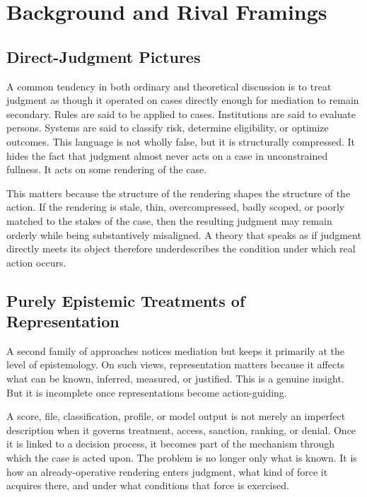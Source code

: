 \documentclass[11pt]{article}
\begin{document}
\section{Background and Rival Framings}

\subsection{Direct-Judgment Pictures}

A common tendency in both ordinary and theoretical discussion is to treat judgment as though it operated on cases directly enough for mediation to remain secondary. Rules are said to be applied to cases. Institutions are said to evaluate persons. Systems are said to classify risk, determine eligibility, or optimize outcomes. This language is not wholly false, but it is structurally compressed. It hides the fact that judgment almost never acts on a case in unconstrained fullness. It acts on some rendering of the case.

This matters because the structure of the rendering shapes the structure of the action. If the rendering is stale, thin, overcompressed, badly scoped, or poorly matched to the stakes of the case, then the resulting judgment may remain orderly while being substantively misaligned. A theory that speaks as if judgment directly meets its object therefore underdescribes the condition under which real action occurs.

\subsection{Purely Epistemic Treatments of Representation}

A second family of approaches notices mediation but keeps it primarily at the level of epistemology. On such views, representation matters because it affects what can be known, inferred, measured, or justified. This is a genuine insight. But it is incomplete once representations become action-guiding.

A score, file, classification, profile, or model output is not merely an imperfect description when it governs treatment, access, sanction, ranking, or denial. Once it is linked to a decision process, it becomes part of the mechanism through which the case is acted upon. The problem is no longer only what is known. It is how an already-operative rendering enters judgment, what kind of force it acquires there, and under what conditions that force is exercised.
\end{document}
